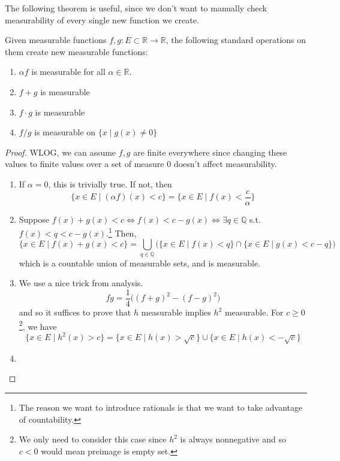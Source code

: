   The following theorem is useful, since we don't want to manually check measurability of every single new function we create. 

  \begin{theorem}
    Given measurable functions $f, g: E \subset \mathbb{R} \to \mathbb{R}$, the following standard operations on them create new measurable functions: 
    \begin{enumerate}
      \item $\alpha f$ is measurable for all $\alpha \in \mathbb{R}$. 
      \item $f + g$ is measurable 
      \item $f \cdot g$ is measurable 
      \item $f / g$ is measurable on $\{x \mid g(x) \neq 0\}$ 
    \end{enumerate}
  \end{theorem} 
  \begin{proof}
    WLOG, we can assume $f, g$ are finite everywhere since changing these values to finite values over a set of measure $0$ doesn't affect measurability. 
    \begin{enumerate}
      \item If $\alpha = 0$, this is trivially true. If not, then 
      \begin{equation}
        \{ x \in E \mid (\alpha f) (x) < c \} = \{x \in E \mid f(x) < \frac{c}{\alpha} \} 
      \end{equation}

      \item Suppose $f(x) + g(x) < c \iff f(x) < c - g(x) \iff \exists q \in \mathbb{Q}$ s.t. $f(x) < q < c - g(x)$.\footnote{The reason we want to introduce rationals is that we want to take advantage of countability.} Then, 
      \begin{equation}
        \{x \in E \mid f(x) + g(x) < c \} = \bigcup_{q \in \mathbb{Q}} \big( \{x \in E \mid f(x) < q\} \cap \{x \in E \mid g(x) < c - q \}\big)
      \end{equation}
      which is a countable union of measurable sets, and is measurable. 

      \item We use a nice trick from analysis. 
      \begin{equation}
        fg = \frac{1}{4} \big( (f + g)^2 - (f - g)^2 \big) 
      \end{equation}
      and so it suffices to prove that $h$ measurable implies $h^2$ measurable. For $c \geq 0$\footnote{We only need to consider this case since $h^2$ is always nonnegative and so $c < 0$ would mean preimage is empty set.}, we have 
      \begin{equation}
        \{ x \in E \mid h^2 (x) > c \} = \{x \in E \mid h(x) > \sqrt{c} \} \cup \{x \in E \mid h(x) < -\sqrt{c} \}
      \end{equation}

      \item 
    \end{enumerate}
  \end{proof}

